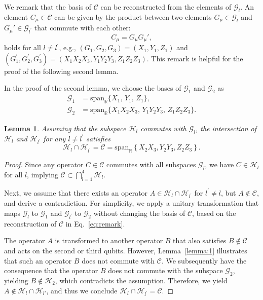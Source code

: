 \documentclass[aps,showpacs,amsmath,amssymb,twocolumn,prx,longbibliography,superscriptaddress,notitlepage,floatfix,10pt]{revtex4-2}
\newtheorem{lemma}{Lemma} %
\begin{document}
We remark that the basis of $\mathcal{C}$ can be reconstructed from the elements of $\mathcal{G}_{l}$. An element $C_\mu\in\mathcal{C}$ can be given by the product between two elements $G_\mu\in\mathcal{G}_{l}$ and $G_\mu'\in\mathcal{G}_{l^{\prime}}$ that commute with each other:
\begin{equation}
    C_\mu=G_\mu G_\mu' \label{eq:remark},
\end{equation}
holds for all $l\not=l^{\prime}$, e.g., $(G_{1},G_{2},G_{3})=(X_{1},Y_{1},Z_{1})$ and $(G_{1}^{\prime},G_{2}^{\prime},G_{3}^{\prime})=(X_{1}X_{2}X_{3},Y_{1}Y_{2}Y_{3},Z_{1}Z_{2}Z_{3})$. 
This remark is helpful for the proof of the following second lemma.

In the proof of the second lemma, we choose the bases of $\mathcal{G}_{1}$ and $\mathcal{G}_{2}$ as
\begin{equation}
\begin{split}
    \mathcal{G}_{1} &= \mathrm{span}_{\mathbb{R}}\{X_{1},\, Y_{1},\, Z_{1} \},\\
        \mathcal{G}_{2} &= \mathrm{span}_{\mathbb{R}}\{X_{1} X_{2} X_{3},\, Y_{1} Y_{2} Y_{3},\, Z_{1} Z_{2} Z_{3}\}.
\end{split}
\label{eq:GEN1}
\end{equation}
\begin{lemma}
    Assuming that the subspace $\mathcal{H}_{l}$ commutes with $\mathcal{G}_{l}$, the intersection of $\mathcal{H}_{l}$ and $\mathcal{H}_{l^{\prime}}$ for any $l\neq l^{\prime}$ satisfies
    \begin{equation}
        \mathcal{H}_{l}\cap\mathcal{H}_{l^{\prime}}=\mathcal{C}=\mathrm{span}_{\mathbb{R}}\left\{X_{2}X_{3},Y_{2}Y_{3},Z_{2}Z_{3}\right\}.
    \end{equation}
\label{lemma:2}
\end{lemma}

\begin{proof}
Since any operator $C\in\mathcal{C}$ commutes with all subspaces $\mathcal{G}_{l}$, we have $C\in\mathcal{H}_{l}$ for all $l$, implying  $\mathcal{C}\subset\bigcap_{l=1}^{4}\mathcal{H}_{l}$.

Next, we assume that there exists an operator $A\in\mathcal{H}_{l}\cap\mathcal{H}_{l^{\prime}}$ for $l^{\prime} \neq l$, but $A\not\in\mathcal{C}$, and derive a contradiction. For simplicity, we apply a unitary transformation that maps $\mathcal{G}_{l}$ to $\mathcal{G}_{1}$ and $\mathcal{G}_{l^{\prime}}$ to $\mathcal{G}_{2}$ without changing the basis of $\mathcal{C}$, based on the reconstruction of  $\mathcal{C}$ in Eq.~\eqref{eq:remark}.

The operator $A$ is transformed to another operator $B$ that also satisfies $B\notin\mathcal{C}$ and acts on the second or third qubits. However, Lemma~\ref{lemma:1} illustrates that such an operator $B$ does not commute with $\mathcal{C}$. We subsequently have the consequence that the operator $B$ does not commute with the subspace $\mathcal{G}_{2}$, yielding $B\not\in\mathcal{H}_{2}$, which contradicts the assumption. Therefore, we yield $A\not\in \mathcal{H}_l\cap\mathcal{H}_{l'}$, and thus we conclude $\mathcal{H}_{l}\cap\mathcal{H}_{l^{\prime}}=\mathcal{C}$.
\end{proof}
\end{document}
